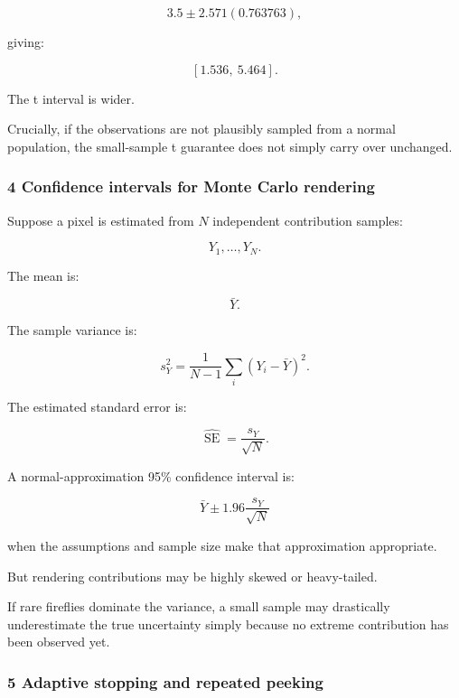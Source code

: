 \[
 3.5\pm2.571(0.763763),
\]

giving:

\[
 \boxed{[1.536,\ 5.464]}.
\]

The t interval is wider.

Crucially, if the observations are not plausibly sampled from a normal population, the small-sample t guarantee does not simply carry over unchanged.

\subsubsection{4 Confidence intervals for Monte Carlo rendering}\label{02-foundations-ii-ch030-confidence-intervals-for-monte-carlo-rendering}

\hypertarget{02-foundations-ii-ch030-confidence-intervals-for-monte-carlo-rendering}{}

Suppose a pixel is estimated from \(N\) independent contribution samples:

\[
 Y_1,\ldots,Y_N.
\]

The mean is:

\[
 \bar Y.
\]

The sample variance is:

\[
 s_Y^2= \frac1{N-1}\sum_i(Y_i-\bar Y)^2.
\]

The estimated standard error is:

\[
 \boxed{ \widehat{\operatorname{SE}}= \frac{s_Y}{\sqrt N} }.
\]

A normal-approximation 95\% confidence interval is:

\[
 \boxed{ \bar Y\pm1.96\frac{s_Y}{\sqrt N} }
\]

when the assumptions and sample size make that approximation appropriate.

But rendering contributions may be highly skewed or heavy-tailed.

If rare fireflies dominate the variance, a small sample may drastically underestimate the true uncertainty simply because no extreme contribution has been observed yet.

\subsubsection{5 Adaptive stopping and repeated peeking}\label{02-foundations-ii-ch030-adaptive-stopping-and-repeated-peeking}

\hypertarget{02-foundations-ii-ch030-adaptive-stopping-and-repeated-peeking}{}

